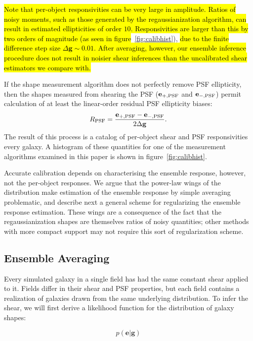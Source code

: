 \documentclass[iop]{emulateapj}
\begin{document}
\hl{Note that per-object responsivities can be very large in
amplitude. Ratios of noisy moments, such as those generated by the
regaussianization algorithm, can result in estimated ellipticities of
order $10$. Responsivities are larger than this by two orders of
magnitude (as seen in figure}~\ref{fig:calibhist}), \hl{due to the finite
difference step size $\Delta \mathbf{g}\sim 0.01$. After averaging,
however, our ensemble inference procedure does not result in noisier
shear inferences than the uncalibrated shear estimators we compare with.}

If the shape measurement algorithm does not perfectly remove PSF
ellipticity, then the shapes measured from shearing the PSF
($\mathbf{e}_{+,\rm PSF}$ and $\mathbf{e}_{-,\rm PSF}$) permit
calculation of at least the linear-order residual PSF ellipticity
biases:
\begin{align}
R_{\rm PSF} = \frac{\mathbf{e}_{+,\rm PSF} - \mathbf{e}_{-,\rm PSF}}{2\Delta\mathbf{g}}.
\end{align}
The result of this process is a catalog of per-object shear and PSF
responsivities every galaxy.  A histogram of these quantities for one
of the measurement algorithms examined in this paper is shown in
figure~\ref{fig:calibhist}. 

Accurate calibration depends on characterising the ensemble response,
however, not the per-object responses. We argue that the power-law
wings of the distribution make estimation of the ensemble response by
simple averaging problematic, and describe next a general scheme for
regularizing the ensemble response estimation. These wings are
a consequence of the fact that the regaussianization shapes are
themselves ratios of noisy quantities; other methods with more compact
support may not require this sort of regularization scheme.

\subsection{Ensemble Averaging}
\label{sec:ensembleAvg}
Every simulated galaxy in a single field has had the same constant
shear applied to it. Fields differ in their shear and PSF properties,
but each field contains a realization of galaxies drawn from the same
underlying distribution. To infer the shear, we will first derive a
likelihood function for the distribution of galaxy shapes:

\begin{equation}
p(\mathbf{e}|\mathbf{g})
\end{equation}
\end{document}
